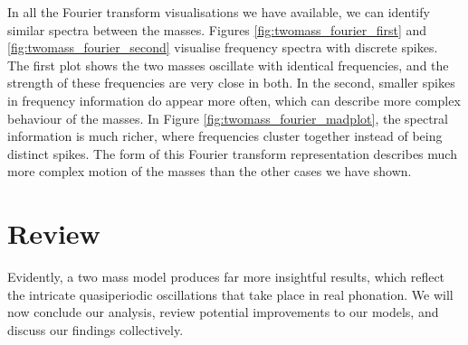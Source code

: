 In all the Fourier transform visualisations we have available,
we can identify similar spectra between the masses.
Figures \ref{fig:twomass_fourier_first} and \ref{fig:twomass_fourier_second} visualise frequency spectra with discrete spikes.
The first plot shows the two masses oscillate with identical frequencies,
and the strength of these frequencies are very close in both.
In the second, smaller spikes in frequency information do appear more often,
which can describe more complex behaviour of the masses.
In Figure \ref{fig:twomass_fourier_madplot},
the spectral information is much richer,
where frequencies cluster together instead of being distinct spikes.
The form of this Fourier transform representation describes much more complex motion of the masses than the other cases we have shown.

\section{Review}

Evidently, a two mass model produces far more insightful results,
which reflect the intricate quasiperiodic oscillations that take place in real phonation.
We will now conclude our analysis, review potential improvements to our models,
and discuss our findings collectively.

%
%

%